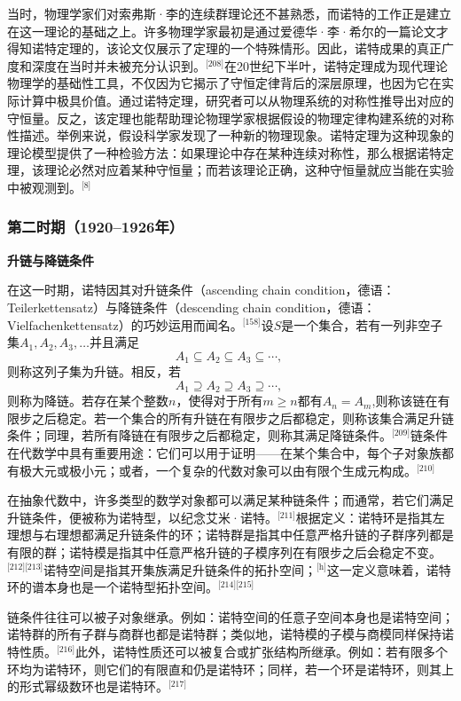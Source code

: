 当时，物理学家们对索弗斯·李的连续群理论还不甚熟悉，而诺特的工作正是建立在这一理论的基础之上。许多物理学家最初是通过爱德华·李·希尔的一篇论文才得知诺特定理的，该论文仅展示了定理的一个特殊情形。因此，诺特成果的真正广度和深度在当时并未被充分认识到。\(^\text{[208]}\)在20世纪下半叶，诺特定理成为现代理论物理学的基础性工具，不仅因为它揭示了守恒定律背后的深层原理，也因为它在实际计算中极具价值。通过诺特定理，研究者可以从物理系统的对称性推导出对应的守恒量。反之，该定理也能帮助理论物理学家根据假设的物理定律构建系统的对称性描述。举例来说，假设科学家发现了一种新的物理现象。诺特定理为这种现象的理论模型提供了一种检验方法：如果理论中存在某种连续对称性，那么根据诺特定理，该理论必然对应着某种守恒量；而若该理论正确，这种守恒量就应当能在实验中被观测到。\(^\text{[8]}\)
\subsubsection{第二时期（1920–1926年）}
\textbf{升链与降链条件}

在这一时期，诺特因其对升链条件（ascending chain condition，德语：Teilerkettensatz）与降链条件（descending chain condition，德语：Vielfachenkettensatz）的巧妙运用而闻名。\(^\text{[158]}\)设$S$是一个集合，若有一列非空子集$A_1, A_2, A_3, \ldots$并且满足
$$
A_1 \subseteq A_2 \subseteq A_3 \subseteq \cdots,~
$$
则称这列子集为升链。相反，若
$$
A_1 \supseteq A_2 \supseteq A_3 \supseteq \cdots,~
$$
则称为降链。若存在某个整数$n$，使得对于所有$m \ge n$都有$A_n = A_m$,则称该链在有限步之后稳定。若一个集合的所有升链在有限步之后都稳定，则称该集合满足升链条件；同理，若所有降链在有限步之后都稳定，则称其满足降链条件。\(^\text{[209]}\)链条件在代数学中具有重要用途：它们可以用于证明——在某个集合中，每个子对象族都有极大元或极小元；或者，一个复杂的代数对象可以由有限个生成元构成。\(^\text{[210]}\)

在抽象代数中，许多类型的数学对象都可以满足某种链条件；而通常，若它们满足升链条件，便被称为诺特型，以纪念艾米·诺特。\(^\text{[211]}\)根据定义：诺特环是指其左理想与右理想都满足升链条件的环；诺特群是指其中任意严格升链的子群序列都是有限的群；诺特模是指其中任意严格升链的子模序列在有限步之后会稳定不变。\(^\text{[212][213]}\)诺特空间是指其开集族满足升链条件的拓扑空间；\(^\text{[h]}\)这一定义意味着，诺特环的谱本身也是一个诺特型拓扑空间。\(^\text{[214][215]}\)

链条件往往可以被子对象继承。例如：诺特空间的任意子空间本身也是诺特空间；诺特群的所有子群与商群也都是诺特群；类似地，诺特模的子模与商模同样保持诺特性质。\(^\text{[216]}\)此外，诺特性质还可以被复合或扩张结构所继承。例如：若有限多个环均为诺特环，则它们的有限直和仍是诺特环；同样，若一个环是诺特环，则其上的形式幂级数环也是诺特环。\(^\text{[217]}\)

